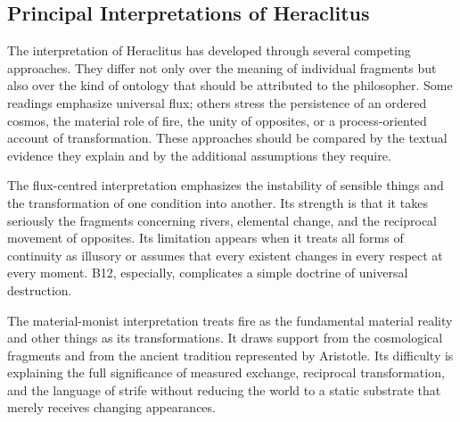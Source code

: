
\subsection{Principal Interpretations of Heraclitus}

\label{para:VS.B01.P01.C08.S03.SS07.P001}

The interpretation of Heraclitus has developed through
several competing approaches. They differ not only
over the meaning of individual fragments but also
over the kind of ontology that should be attributed
to the philosopher. Some readings emphasize universal
flux; others stress the persistence of an ordered
cosmos, the material role of fire, the unity of
opposites, or a process-oriented account of
transformation. These approaches should be compared
by the textual evidence they explain and by the
additional assumptions they require.

\label{para:VS.B01.P01.C08.S03.SS07.P002}

The flux-centred interpretation emphasizes the
instability of sensible things and the transformation
of one condition into another. Its strength is that
it takes seriously the fragments concerning rivers,
elemental change, and the reciprocal movement of
opposites. Its limitation appears when it treats
all forms of continuity as illusory or assumes
that every existent changes in every respect at
every moment. B12, especially, complicates a
simple doctrine of universal destruction.

\label{para:VS.B01.P01.C08.S03.SS07.P003}

The material-monist interpretation treats fire
as the fundamental material reality and other
things as its transformations. It draws support
from the cosmological fragments and from the
ancient tradition represented by Aristotle.
Its difficulty is explaining the full significance
of measured exchange, reciprocal transformation,
and the language of strife without reducing
the world to a static substrate that merely
receives changing appearances.



\label{para:VS.B01.P01.C08.S03.SS07.P004}

